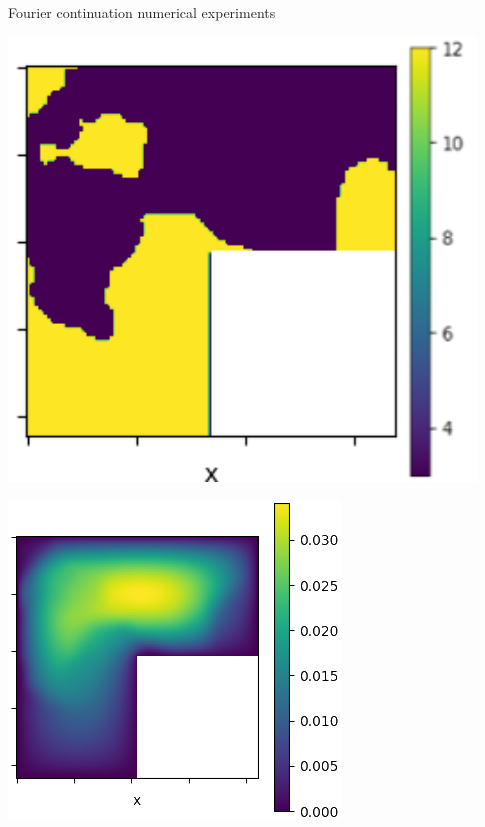 \documentclass{beamer}
\begin{document}
\begin{frame}{Fourier continuation numerical experiments}
	\begin{center}
        \begin{minipage}{0.24\textwidth}
            \includegraphics[width=0.93\textwidth]{FNO_continuation_input.png}
        \end{minipage}
        \hfill
        \begin{minipage}{0.24\textwidth}
            \includegraphics[width=\textwidth]{FNO_continuation_output.png}

\end{minipage}
\end{center}
\end{frame}
\end{document}
